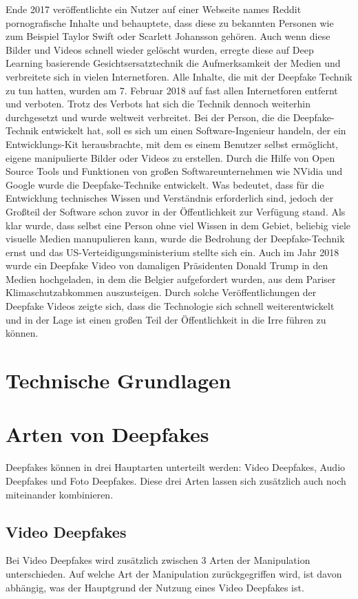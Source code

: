 Ende 2017 veröffentlichte ein Nutzer auf einer Webseite names Reddit pornografische Inhalte und behauptete, dass diese zu bekannten Personen wie zum Beispiel Taylor Swift oder Scarlett Johansson gehören.
Auch wenn diese Bilder und Videos schnell wieder gelöscht wurden, erregte diese auf Deep Learning basierende Gesichtsersatztechnik die Aufmerksamkeit der Medien und verbreitete sich in vielen Internetforen.
Alle Inhalte, die mit der Deepfake Technik zu tun hatten, wurden am 7. Februar 2018 auf fast allen Internetforen entfernt und verboten.
Trotz des Verbots hat sich die Technik dennoch weiterhin durchgesetzt und wurde weltweit verbreitet.
Bei der Person, die die Deepfake-Technik entwickelt hat, soll es sich um einen Software-Ingenieur handeln, der ein Entwicklungs-Kit herausbrachte, mit dem es einem Benutzer selbst ermöglicht, eigene manipulierte Bilder oder Videos zu erstellen.
Durch die Hilfe von Open Source Tools und Funktionen von großen Softwareunternehmen wie NVidia und Google wurde die Deepfake-Technike entwickelt. Was bedeutet, dass für die Entwicklung technisches Wissen und Verständnis erforderlich sind, jedoch der Großteil der Software schon zuvor in der Öffentlichkeit zur Verfügung stand.
Als klar wurde, dass selbst eine Person ohne viel Wissen in dem Gebiet, beliebig viele visuelle Medien manupulieren kann, wurde die Bedrohung der Deepfake-Technik ernst und das US-Verteidigungsministerium stellte sich ein.
Auch im Jahr 2018 wurde ein Deepfake Video von damaligen Präsidenten Donald Trump in den Medien hochgeladen, in dem die Belgier aufgefordert wurden, aus dem Pariser Klimaschutzabkommen auszusteigen.\newline
Durch solche Veröffentlichungen der Deepfake Videos zeigte sich, dass die Technologie sich schnell weiterentwickelt und in der Lage ist einen großen Teil der Öffentlichkeit in die Irre führen zu können.\cite{Jatit}

\section{Technische Grundlagen}
\section{Arten von Deepfakes}
Deepfakes können in drei Hauptarten unterteilt werden: Video Deepfakes, Audio Deepfakes und Foto Deepfakes. Diese drei Arten lassen sich zusätzlich auch noch miteinander kombinieren.\cite{ResearchGate}\newline
\subsection{Video Deepfakes}
Bei Video Deepfakes wird zusätzlich zwischen 3 Arten der Manipulation unterschieden. Auf welche Art der Manipulation zurückgegriffen wird, ist davon abhängig, was der Hauptgrund der Nutzung eines Video Deepfakes ist.\cite{ResearchGate}

